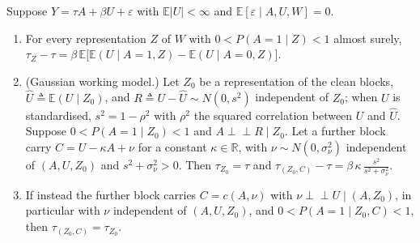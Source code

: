 \begin{proposition}
\label{prop:single-image-decomposition}
\normalfont
Suppose $Y=\tau A+\beta U+\varepsilon$ with $\mathbb E|U|<\infty$ and $\mathbb E[\varepsilon\mid A,U,W]=0$.
\begin{enumerate}
\item[(a)] For every representation $Z$ of $W$ with $0<P(A=1\mid Z)<1$ almost surely,
\(\tau_Z-\tau=\beta\,\mathbb E\bigl[\mathbb E(U\mid A=1,Z)-\mathbb E(U\mid A=0,Z)\bigr].\)
\item[(b)] (Gaussian working model.) Let $Z_0$ be a representation of the clean blocks, $\widehat U\triangleq\mathbb E(U\mid Z_0)$, and $R\triangleq U-\widehat U\sim N(0,s^2)$ independent of $Z_0$; when $U$ is standardised, $s^2=1-\rho^2$ with $\rho^2$ the squared correlation between $U$ and $\widehat U$. Suppose $0<P(A=1\mid Z_0)<1$ and $A\perp\!\!\!\perp R\mid Z_0$. Let a further block carry $C=U-\kappa A+\nu$ for a constant $\kappa\in\mathbb R$, with $\nu\sim N(0,\sigma_\nu^2)$ independent of $(A,U,Z_0)$ and $s^2+\sigma_\nu^2>0$. Then $\tau_{Z_0}=\tau$ and
\(\tau_{(Z_0,C)}-\tau=\beta\,\kappa\,\frac{s^2}{s^2+\sigma_\nu^2}.\)
\item[(c)] If instead the further block carries $C=c(A,\nu)$ with $\nu\perp\!\!\!\perp U\mid(A,Z_0)$, in particular with $\nu$ independent of $(A,U,Z_0)$, and $0<P(A=1\mid Z_0,C)<1$, then $\tau_{(Z_0,C)}=\tau_{Z_0}$.
\end{enumerate}
\end{proposition}

